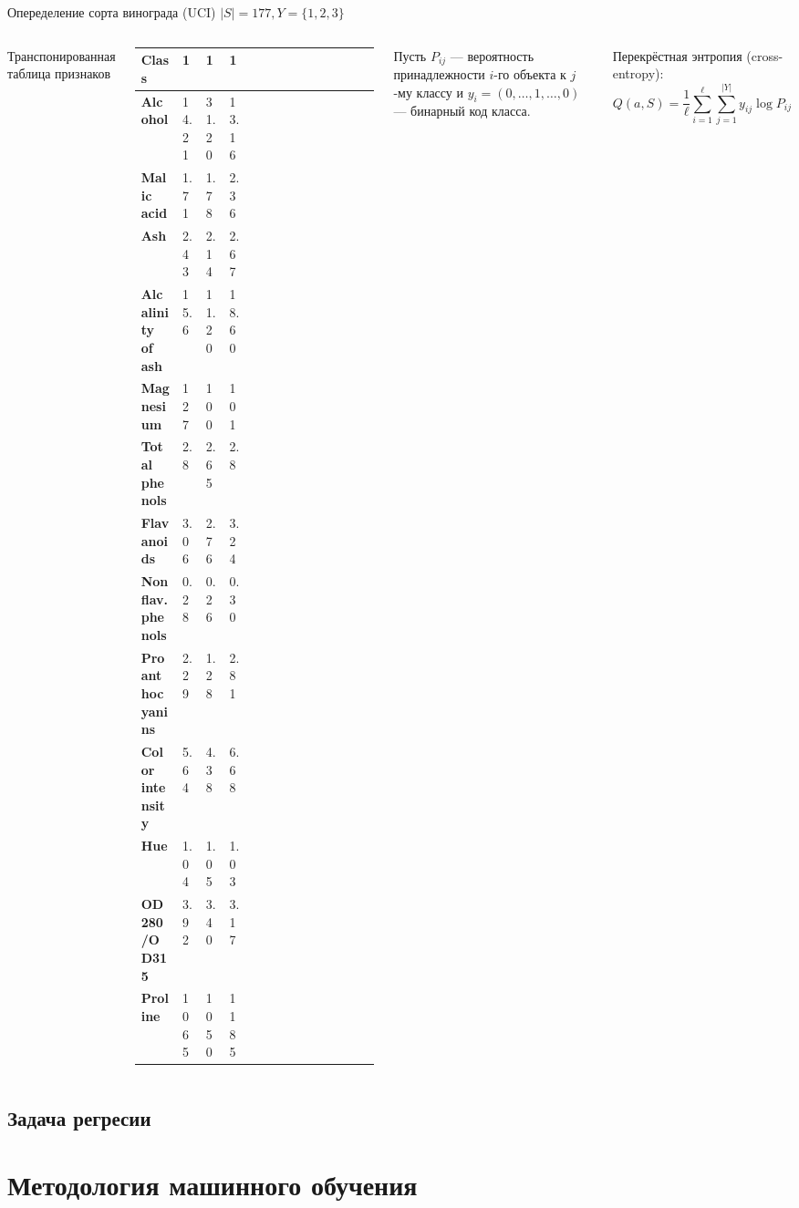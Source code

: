 \documentclass{beamer}
\begin{document}
\begin{frame}{Опеределение сорта винограда (UCI)}
$|S| = 177, Y = \{1, 2, 3\}$

\begin{columns}
Транспонированная таблица признаков
\scriptsize
\begin{tabular}{|l|l|l|l|l|l|l|l|l|l|l|l|l|l|}
\hline
\bf Class & 1 & 1 & 1 \\
\hline
\bf Alcohol & 14.21 & 31.20 & 13.16 \\
\hline
\bf Malic acid & 1.71 & 1.78 & 2.36 \\
\hline
\bf Ash & 2.43 & 2.14 & 2.67 \\
\hline
\bf Alcalinity of ash   & 15.6 & 11.20 & 18.60 \\
\hline
\bf Magnesium & 127 & 100 & 101 \\
\hline
\bf Total phenols & 2.8 & 2.65 & 2.8 \\
\hline
\bf Flavanoids & 3.06 & 2.76 & 3.24 \\
\hline
\bf Nonflav. phenols & 0.28 & 0.26 & 0.30 \\
\hline
\bf Proanthocyanins & 2.29 & 1.28 & 2.81 \\
\hline
\bf Color intensity & 5.64 & 4.38 & 6.68 \\
\hline
\bf Hue & 1.04 & 1.05 & 1.03 \\
\hline
\bf OD280/OD315 & 3.92 & 3.40 & 3.17 \\
\hline
\bf Proline & 1065 & 1050 & 1185 \\
\hline
\end{tabular}

Пусть $P_{ij}$ --- вероятность принадлежности $i$-го объекта к $j$-му классу и $y_i = (0,\dots, 1, \dots, 0)$ --- бинарный код класса.

\vfill
Перекрёстная энтропия (cross-entropy):
$$
Q(a, S) = \frac{1}{\ell}\sum\limits_{i=1}^{\ell}\sum\limits_{j=1}^{|Y|}y_{ij}\log P_{ij}
$$
\end{columns}
\end{frame}

\subsection{Задача регресии}
\begin{frame}
\end{frame}

\section{Методология машинного обучения}
\end{document}
